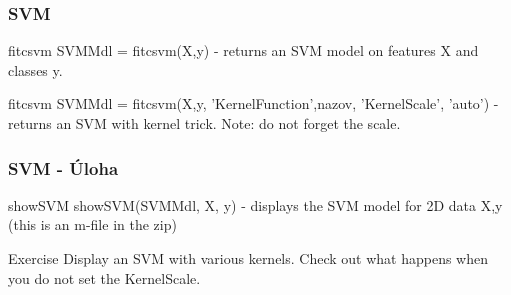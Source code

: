 \documentclass{beamer}
\begin{document}
\begin{frame}
\frametitle{SVM}
\begin{block}{fitcsvm}
SVMMdl = fitcsvm(X,y) - returns an SVM model on features X and classes y.
\end{block}

\begin{block}{fitcsvm}
SVMMdl = fitcsvm(X,y, 'KernelFunction',nazov, 'KernelScale', 'auto') - returns an SVM with kernel trick. Note: do not forget the scale.
\end{block}
\end{frame}


\begin{frame}
\frametitle{SVM - Úloha}
\begin{block}{showSVM}
showSVM(SVMMdl, X, y) - displays the SVM model for 2D data X,y (this is an m-file in the zip)
\end{block}

\begin{block}{Exercise}
Display an SVM with various kernels. Check out what happens when you do not set the KernelScale.
\end{block}
\end{frame}
\end{document}
